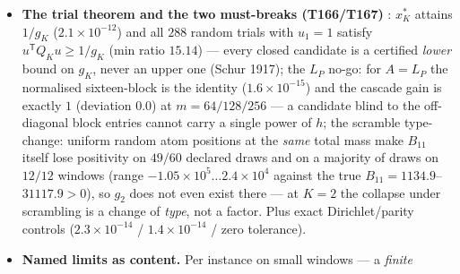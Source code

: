 \documentclass[11pt,a4paper]{article}
\begin{document}
\begin{itemize}[leftmargin=1.5em]
$u=x^*_K+\delta$ with $\delta_1=0$,
$u^{\mathsf T}Q_Ku=1/g_K+\delta^{\mathsf T}Q_K\delta$ \emph{exactly}
($2.0\times10^{-12}$ on $252$ evaluations across three $\delta$ scales) --- every
relative excess $\rho=g_K\,\delta^{\mathsf T}Q_K\delta$ is an exact number, never an
estimate; the Rayleigh envelope holds on the battery, its $\delta_1=0$ ceiling
$\lambda_{\max}(Q_{HH})$ is attained exactly ($1.1\times10^{-15}$) and Cauchy-interlaced,
turning $\rho$ into the vector threshold
$\mathrm{eps}_{\mathrm{vec}}=\sqrt{\rho/(g_K\lambda_{\max})}/\|x^*\|$ with the square law
$\mathrm{eps}_{\mathrm{ent}}\sim\mathrm{eps}_{\mathrm{vec}}^2$; the sign-aligned
entrywise perturbation attains $|x^{*\mathsf T}Ex^*|=\varepsilon S_K$ exactly
($3.8\times10^{-16}$, $S_K=|x^*|^{\mathsf T}|Q||x^*|$), so the entry threshold
$\mathrm{eps}_{\mathrm{ent}}(K)=\rho_{\mathrm{carry}}(1/g_K)/S_K$ is exact --- and the
\emph{unification}: $(1/g_K)/S_K$ is the one cancellation ratio of all three dresses ---
T166's determinant ratio over the absolute-value mass (dress a), at $K=2$ literally
$(1/g_2)/S_2=(1-r_{12}^2)/(1+3r_{12}^2)$ verified to $1.2\times10^{-12}$ (dress b, up to
the closed factor $1+3r_{12}^2\to4$ --- T166's independently derived quarter), and the
entry threshold itself (dress c): \emph{one} inequality, not three. Mutation:
$\delta_1=0.1$ breaks the pivot identity by exactly the closed cross term
$2\delta_1=0.2$ ($2.0\times10^{-12}$).
\item \textbf{The trial theorem and the two must-breaks (T166/T167)} \mE: $x^*_K$
attains $1/g_K$ ($2.1\times10^{-12}$) and all $288$ random trials with $u_1=1$ satisfy
$u^{\mathsf T}Q_Ku\ge1/g_K$ (min ratio $15.14$) --- every closed candidate is a
certified \emph{lower} bound on $g_K$, never an upper one (Schur 1917); the $L_P$
no-go: for $A=L_P$ the normalised sixteen-block is the identity
($1.6\times10^{-15}$) and the cascade gain is exactly $1$ (deviation $0.0$) at
$m=64/128/256$ --- a candidate blind to the off-diagonal block entries cannot carry a
single power of $h$; the scramble type-change: uniform random atom positions at the
\emph{same} total mass make $B_{11}$ itself lose positivity on $49/60$ declared draws
and on a majority of draws on $12/12$ windows (range
$-1.05\times10^{5}\ldots2.4\times10^{4}$ against the true
$B_{11}=1134.9$--$31117.9>0$), so $g_2$ does not even exist there --- at $K=2$ the
collapse under scrambling is a change of \emph{type}, not a factor. Plus exact
Dirichlet/parity controls ($2.3\times10^{-14}$ / $1.4\times10^{-14}$ / zero tolerance).
\item \textbf{Named limits as content.} Per instance on small windows --- a \emph{finite
}
\end{itemize}
\end{document}
